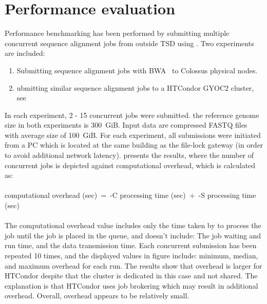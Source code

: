 \section{Performance evaluation}
\label{sec:performance}
Performance benchmarking has been performed by submitting multiple concurrent sequence alignment jobs from outside TSD using \name. Two experiments are included:
\begin{enumerate}
	\item Submitting sequence alignment jobs with BWA~\cite{bwa} to Colossus physical nodes.
	\item ubmitting similar sequence alignment jobs to a HTCondor GYOC2 cluster, see~
\end{enumerate}
In each experiment, 2 - 15 concurrent jobs were submitted. the reference genome size in both experiments is 300~GiB. Input data are compressed FASTQ files with average size of 100~GiB. For each experiment, all submissions were initiated from a PC which is located at the same building as the file-lock gateway (in order to avoid additional network latency).  presents the results, where the number of concurrent jobs is depicted against \name computational overhead, which is calculated as:\\\\
\name computational overhead (sec)~=~\name-C processing time (sec)~+~\name-S processing time (sec)
\\\\
The \name computational overhead value includes only the time taken by \name to process the job until the job is placed in the queue, and doesn't include: The job waiting and run time, and the data transmission time. Each concurrent submission has been repeated 10 times, and the displayed values in figure include: minimum,  median, and maximum overhead for each run. The results show that \name overhead is larger for HTCondor despite that the cluster is dedicated in this case and not shared. The explanation is that HTCondor uses job brokering which may result in additional overhead. Overall, \name overhead appears to be relatively small.

